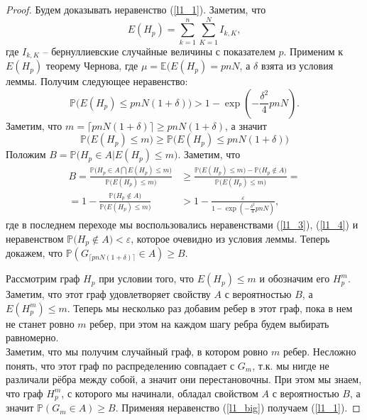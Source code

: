 \documentclass{matmex-diploma-custom}
\newcommand{\Expect}{\mathbb E}
\newcommand{\PRob}{\mathbb P}
\newcommand{\leqs}{\leqslant}
\newcommand{\geqs}{\geqslant}
\newcommand{\eps}{\varepsilon}
\theoremstyle{named}
\begin{document}
\begin{proof}
Будем доказывать неравенство (\ref{l1_1}). Заметим, что 
\begin{equation}
E(H_p) = \sum_{k=1}^n \sum_{K=1}^N I_{k, K},
\end{equation}
где $I_{k,K}$ -- бернуллиевские случайные величины с показателем $p$.
Применим к $E(H_p)$ теорему Чернова, где $\mu = \Expect(E(H_p) = pnN$, а $\delta$ взята из условия леммы.
Получим следующее неравенство:
\begin{equation}\label{l1_3}
\PRob\big( E(H_p) \leqs pnN(1+\delta) \big) > 1 - \exp\left(-\frac{\delta^2}{4}pnN\right).
\end{equation}
Заметим, что $m = \lceil pnN(1+\delta) \rceil \geqs pnN(1+\delta)$, а значит
\begin{equation}\label{l1_4}
\PRob\big( E(H_p) \leqs m \big) \geqs \PRob\big( E(H_p) \leqs pnN(1+\delta) \big)
\end{equation}
Положим $B = \PRob\Big( H_p \in A \big| E(H_p) \leqs m \Big)$. Заметим, что
\begin{equation}\label{l1_big}
\begin{aligned}
B = \frac{
		\PRob\Big( H_p \in A \bigcap E(H_p) \leqs m \Big)
	}{
		\PRob\big(E(H_p) \leqs m \big)
	} 
&\geqs 
	\frac{
		\PRob\big(E(H_p) \leqs m \big) 
			-
		\PRob\big(H_p \not\in A \big)
	}{
		\PRob\big(E(H_p) \leqs m\big)
	}
=
\\
=
	1 
		-
	\frac{
		\PRob\big(H_p \not\in A \big)
	}{
		\PRob\big(E(H_p) \leqs m\big)
	}
&>
	1
		-
	\frac{\eps}{
		1 - \exp\left(-\frac{\delta^2}{4}pnN\right)
	},
\end{aligned}\end{equation}
где в последнем переходе мы воспользовались неравенствами (\ref{l1_3}), (\ref{l1_4}) 
и неравенством $\PRob\big(H_p \not\in A \big) < \eps$, которое очевидно из условия леммы.
Теперь докажем, что $\PRob(G_{\lceil pnN(1+\delta) \rceil} \in A) \geqs B$.

Рассмотрим граф $H_p$ при условии того, что $E(H_p) \leqs m$ и обозначим его $H_p^m$. 
Заметим, что этот граф удовлетворяет свойству $A$ с вероятностью $B$, а $E(H_p^m) \leqs m$.
Теперь мы несколько раз добавим ребер в этот граф, пока в нем не станет ровно $m$ ребер, 
при этом на каждом шагу ребра будем выбирать равномерно.
\\
Заметим, что мы получим случайный граф, в котором ровно $m$ ребер. Несложно понять, 
что этот граф по распределению совпадает с $G_m$, т.к. мы нигде не различали рёбра между собой, а значит они перестановочны.
При этом мы знаем, что граф $H_p^m$, с которого мы начинали, обладал свойством $A$ с вероятностью $B$, 
а значит $\PRob(G_m \in A) \geqs B$. Применяя неравенство (\ref{l1_big}) получаем (\ref{l1_1}).


\end{proof}
\end{document}
